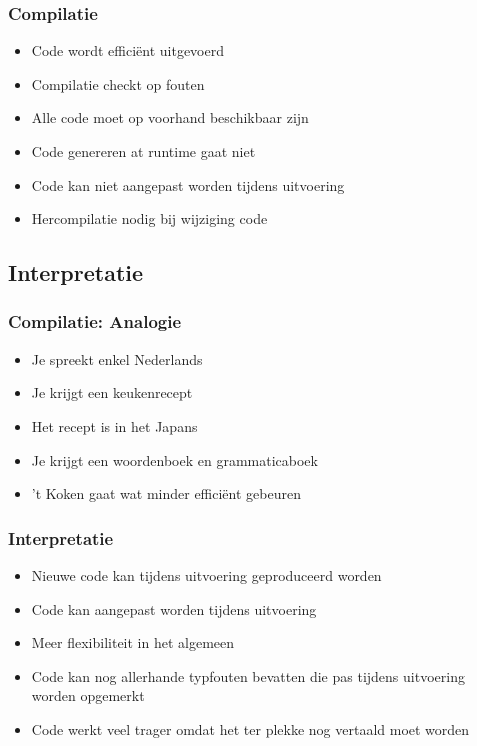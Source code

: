 \begin{frame}
  \frametitle{Compilatie}
  \begin{itemize}
    \item Code wordt effici\"ent uitgevoerd
    \item Compilatie checkt op fouten
  \end{itemize}
  \vskip5mm
  \begin{itemize}
    \item Alle code moet op voorhand beschikbaar zijn
    \item Code genereren at runtime gaat niet
    \item Code kan niet aangepast worden tijdens uitvoering
    \item Hercompilatie nodig bij wijziging code
  \end{itemize}
\end{frame}

\subsection{Interpretatie}

\frame{\tableofcontents[currentsubsection]}

\begin{frame}
  \frametitle{Compilatie: Analogie}
  \begin{itemize}
    \item Je spreekt enkel Nederlands
    \item Je krijgt een keukenrecept
    \item Het recept is in het Japans
    \item Je krijgt een woordenboek en grammaticaboek
    \item 't Koken gaat wat minder effici\"ent gebeuren
  \end{itemize}
\end{frame}

\begin{frame}
  \frametitle{Interpretatie}
  \begin{itemize}
    \item Nieuwe code kan tijdens uitvoering geproduceerd worden
    \item Code kan aangepast worden tijdens uitvoering
    \item Meer flexibiliteit in het algemeen
  \end{itemize}
  \vskip5mm
  \begin{itemize}
    \item Code kan nog allerhande typfouten bevatten die pas tijdens uitvoering worden opgemerkt
    \item Code werkt veel trager omdat het ter plekke nog vertaald moet worden
  \end{itemize}
\end{frame}



